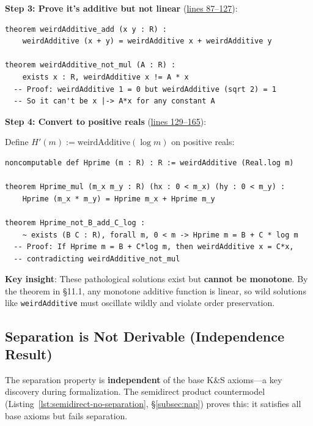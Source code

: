 \documentclass[11pt]{article}
\theoremstyle{definition}
\theoremstyle{remark}
\begin{document}
\textbf{Step 3: Prove it's additive but not linear} (\href{https://github.com/zariuq/ks-foundations-of-inference/blob/main/KnuthSkilling/Counterexamples/CauchyPathology.lean\#L87-L127}{lines 87--127}):

\begin{lstlisting}[caption={weirdAdditive satisfies Cauchy's equation but isn't linear}]
theorem weirdAdditive_add (x y : R) :
    weirdAdditive (x + y) = weirdAdditive x + weirdAdditive y

theorem weirdAdditive_not_mul (A : R) :
    exists x : R, weirdAdditive x != A * x
  -- Proof: weirdAdditive 1 = 0 but weirdAdditive (sqrt 2) = 1
  -- So it can't be x |-> A*x for any constant A
\end{lstlisting}

\textbf{Step 4: Convert to positive reals} (\href{https://github.com/zariuq/ks-foundations-of-inference/blob/main/KnuthSkilling/Counterexamples/CauchyPathology.lean\#L129-L165}{lines 129--165}):

Define $H'(m) := \text{weirdAdditive}(\log m)$ on positive reals:

\begin{lstlisting}[caption={Multiplicative-additive pathology on positive reals}]
noncomputable def Hprime (m : R) : R := weirdAdditive (Real.log m)

theorem Hprime_mul (m_x m_y : R) (hx : 0 < m_x) (hy : 0 < m_y) :
    Hprime (m_x * m_y) = Hprime m_x + Hprime m_y

theorem Hprime_not_B_add_C_log :
    ~ exists (B C : R), forall m, 0 < m -> Hprime m = B + C * log m
  -- Proof: If Hprime m = B + C*log m, then weirdAdditive x = C*x,
  -- contradicting weirdAdditive_not_mul
\end{lstlisting}

\textbf{Key insight}: These pathological solutions exist but \textbf{cannot be monotone}.
By the theorem in \S11.1, any monotone additive function is linear, so wild solutions
like \texttt{weirdAdditive} must oscillate wildly and violate order preservation.

\subsection{Separation is Not Derivable (Independence Result)}
\label{subsec:separation-independence}

The separation property is \textbf{independent} of the base K\&S axioms---a key discovery during formalization. The semidirect product countermodel (Listing~\ref{lst:semidirect-no-separation}, \S\ref{subsec:nap}) proves this: it satisfies all base axioms but fails separation.
\end{document}
